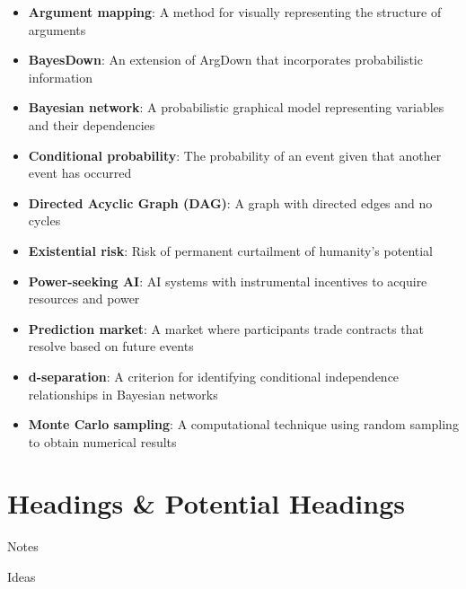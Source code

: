 \documentclass[
  letterpaper,
]{book}
\providecommand{\tightlist}{%
  \setlength{\itemsep}{0pt}\setlength{\parskip}{0pt}}
\begin{document}
\begin{itemize}
\tightlist
\item
  \textbf{Argument mapping}: A method for visually representing the
  structure of arguments\\
\item
  \textbf{BayesDown}: An extension of ArgDown that incorporates
  probabilistic information\\
\item
  \textbf{Bayesian network}: A probabilistic graphical model
  representing variables and their dependencies\\
\item
  \textbf{Conditional probability}: The probability of an event given
  that another event has occurred\\
\item
  \textbf{Directed Acyclic Graph (DAG)}: A graph with directed edges and
  no cycles\\
\item
  \textbf{Existential risk}: Risk of permanent curtailment of humanity's
  potential\\
\item
  \textbf{Power-seeking AI}: AI systems with instrumental incentives to
  acquire resources and power\\
\item
  \textbf{Prediction market}: A market where participants trade
  contracts that resolve based on future events\\
\item
  \textbf{d-separation}: A criterion for identifying conditional
  independence relationships in Bayesian networks\\
\item
  \textbf{Monte Carlo sampling}: A computational technique using random
  sampling to obtain numerical results
\end{itemize}


\chapter*{Headings \& Potential Headings}\label{sec-heading}


Notes

Ideas
\end{document}
